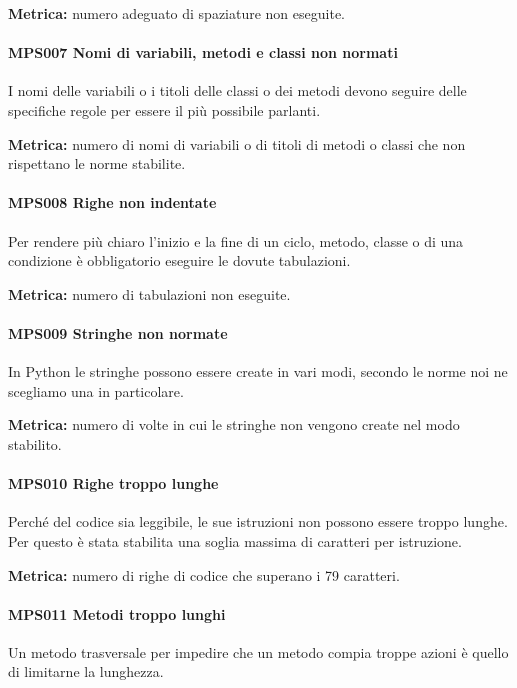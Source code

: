         \textbf{Metrica:} numero adeguato di spaziature non eseguite.

        \paragraph{MPS007 Nomi di variabili, metodi e classi non normati}
        I nomi delle variabili o i titoli delle classi o dei metodi devono seguire delle specifiche regole per essere il più possibile parlanti.

        \textbf{Metrica:} numero di nomi di variabili o di titoli di metodi o classi che non rispettano le norme stabilite.

        \paragraph{MPS008 Righe non indentate}
        Per rendere più chiaro l'inizio e la fine di un ciclo, metodo, classe
        o di una condizione è obbligatorio eseguire le dovute tabulazioni.

        \textbf{Metrica:} numero di tabulazioni non eseguite.

        \paragraph{MPS009 Stringhe non normate}
        In Python le stringhe possono essere create in vari modi, secondo le norme noi ne scegliamo una in particolare.

        \textbf{Metrica:} numero di volte in cui le stringhe non vengono create nel modo stabilito.

        \paragraph{MPS010 Righe troppo lunghe}
        Perché del codice sia leggibile, le sue istruzioni non possono essere troppo lunghe. Per questo è stata stabilita una soglia massima di caratteri per istruzione.

        \textbf{Metrica:} numero di righe di codice che superano i 79 caratteri.

        \paragraph{MPS011 Metodi troppo lunghi}
        Un metodo trasversale per impedire che un metodo compia troppe azioni è quello di limitarne la lunghezza.

